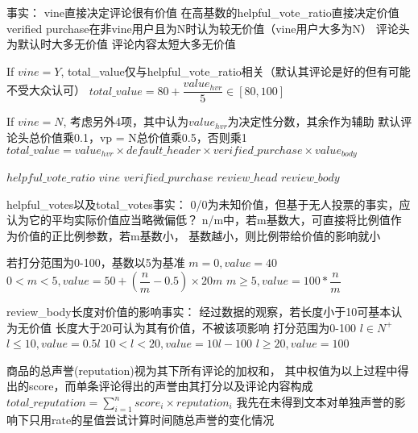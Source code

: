 


事实：
vine直接决定评论很有价值
在高基数的helpful_vote_ratio直接决定价值
verified purchase在非vine用户且为N时认为较无价值（vine用户大多为N）
评论头为默认时大多无价值
评论内容太短大多无价值

If $vine = Y$, total_value仅与helpful_vote_ratio相关（默认其评论是好的但有可能不受大众认可）
$total\_value = 80 + \dfrac{value_{hvr}}{5} \in [80, 100]$

If $vine = N$, 考虑另外4项，其中认为$value_{hvr}$为决定性分数，其余作为辅助
默认评论头总价值乘0.1，vp = N总价值乘0.5，否则乘1
$total\_value = value_{hvr} \times default\_header \times verified\_purchase \times value_{body} $


$helpful\_vote\_ratio$
$vine$
$verified\_purchase$
$review\_head$
$review\_body$

helpful_votes以及total_votes事实：
0/0为未知价值，但基于无人投票的事实，应认为它的平均实际价值应当略微偏低？
n/m中，若m基数大，可直接将比例值作为价值的正比例参数，若m基数小，
基数越小，则比例带给价值的影响就小

若打分范围为0-100，基数以5为基准
$m = 0, value = 40$
$0 < m < 5, value = 50 + (\dfrac{n}{m} - 0.5) \times 20m$
$m \geq 5, value = 100 * \dfrac{n}{m}$


review_body长度对价值的影响事实：
经过数据的观察，若长度小于10可基本认为无价值
长度大于20可认为其有价值，不被该项影响
打分范围为0-100
$l \in N^+$
$l \leq 10, value = 0.5l$
$10 < l < 20, value = 10l - 100$
$l \geq 20, value = 100$



商品的总声誉(reputation)视为其下所有评论的加权和，
其中权值为以上过程中得出的score，而单条评论得出的声誉由其打分以及评论内容构成
$total\_reputation = \sum^n_{i=1}score_i \times reputation_i$
我先在未得到文本对单独声誉的影响下只用rate的星值尝试计算时间随总声誉的变化情况
